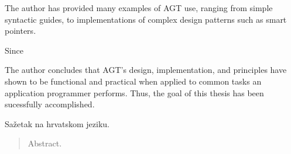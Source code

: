 \documentclass[times, utf8, diplomski]{fer}
\theoremstyle{definition}
\begin{document}
The author has provided many examples of AGT use, ranging from simple syntactic guides,
to implementations of complex design patterns such as smart pointers.

Since 

The author concludes that AGT's design, implementation, and principles have shown to be
functional and practical when applied to common tasks an application programmer performs. 
Thus, the goal of this thesis has been sucessfully accomplished.




\begin{sazetak}
Sažetak na hrvatskom jeziku.

\end{sazetak}

\begin{abstract}
Abstract.

\end{abstract}
\end{document}
